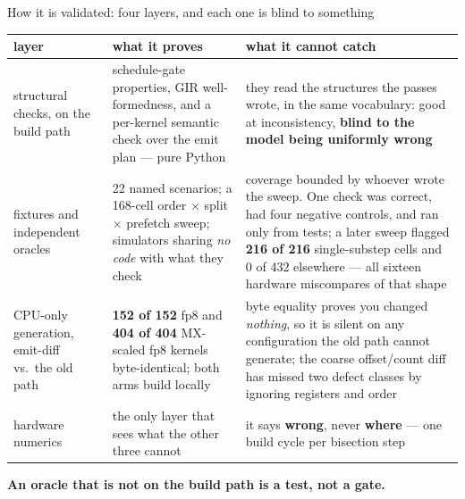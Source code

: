 \documentclass[aspectratio=169,9pt]{beamer}
\newcommand{\key}[1]{\textcolor{acc}{\textbf{#1}}}
\newcommand{\bad}[1]{\textcolor{warn}{\textbf{#1}}}
\newcommand{\good}[1]{\textcolor{ok}{\textbf{#1}}}
\begin{document}
\begin{frame}{How it is validated: four layers, and each one is blind to something}
\begin{center}
{\scriptsize\setlength{\tabcolsep}{4pt}
\begin{tabular}{p{2.4cm}p{4.2cm}p{5.0cm}}
\toprule
\textbf{layer} & \textbf{what it proves} & \textbf{what it cannot catch} \\
\midrule
structural checks, on the build path &
schedule-gate properties, GIR well-formedness, and a per-kernel semantic check over the emit plan --- pure Python &
they read the structures the passes wrote, in the same vocabulary: good at inconsistency, \bad{blind to the model being uniformly wrong} \\
\addlinespace
fixtures and independent oracles &
22 named scenarios; a 168-cell order $\times$ split $\times$ prefetch sweep; simulators sharing \emph{no code} with what they check &
coverage bounded by whoever wrote the sweep. One check was correct, had four negative controls, and ran only from tests; a later sweep flagged \bad{216 of 216} single-substep cells and 0 of 432 elsewhere --- all sixteen hardware miscompares of that shape \\
\addlinespace
CPU-only generation, emit-diff vs.\ the old path &
\good{152 of 152} fp8 and \good{404 of 404} MX-scaled fp8 kernels byte-identical; both arms build locally &
byte equality proves you changed \emph{nothing}, so it is silent on any configuration the old path cannot generate; the coarse offset/count diff has missed two defect classes by ignoring registers and order \\
\addlinespace
hardware numerics &
the only layer that sees what the other three cannot &
it says \bad{wrong}, never \bad{where} --- one build cycle per bisection step \\
\bottomrule
\end{tabular}}
\end{center}
\begin{center}
\key{An oracle that is not on the build path is a test, not a gate.}
\end{center}
\end{frame}
\end{document}
